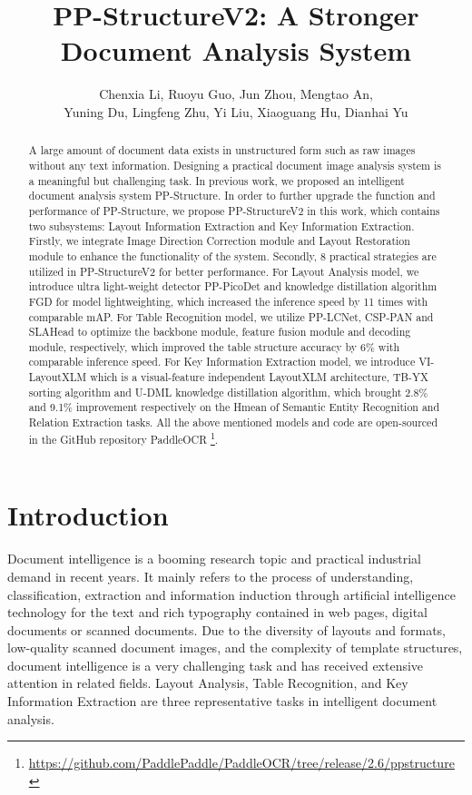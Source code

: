 \documentclass[letterpaper]{article} \usepackage{aaai21}  \usepackage{times}  \usepackage{helvet} \usepackage{courier}  \usepackage[hyphens]{url}  \usepackage{graphicx} \usepackage{algorithm}
\title{PP-StructureV2: A Stronger Document Analysis System}
\author {
    Chenxia Li, Ruoyu Guo, Jun Zhou,  Mengtao An, \\
   Yuning Du, Lingfeng Zhu, Yi Liu, Xiaoguang Hu, Dianhai Yu \\
}
\begin{document}
\maketitle

\begin{abstract}

A large amount of document data exists in unstructured form such as raw images without any text information. Designing a practical document image analysis system is a meaningful but challenging task. In previous work, we proposed an intelligent document analysis system PP-Structure. In order to further upgrade the function and performance of PP-Structure, we propose PP-StructureV2 in this work, which contains two subsystems: Layout Information Extraction and Key Information Extraction. Firstly, we integrate Image Direction Correction module and Layout Restoration module to enhance the functionality of the system. Secondly, 8 practical strategies are utilized in PP-StructureV2 for better performance. For Layout Analysis model, we introduce ultra light-weight detector PP-PicoDet and knowledge distillation algorithm FGD for model lightweighting, which increased the inference speed by 11 times with comparable mAP. For Table Recognition model, we utilize PP-LCNet, CSP-PAN and SLAHead to optimize the backbone module, feature fusion module and decoding module, respectively, which improved the table structure accuracy by 6\% with comparable inference speed. For Key Information Extraction model, we introduce VI-LayoutXLM which is a visual-feature independent LayoutXLM architecture, TB-YX sorting algorithm and U-DML knowledge distillation algorithm, which brought 2.8\% and 9.1\% improvement respectively on the Hmean of Semantic Entity Recognition and Relation Extraction tasks. All the above mentioned models and code are open-sourced in the GitHub repository PaddleOCR \footnote{\url{https://github.com/PaddlePaddle/PaddleOCR/tree/release/2.6/ppstructure}}.

\end{abstract}

\section{Introduction}

Document intelligence is a booming research topic and practical industrial demand in recent years. It mainly refers to the process of understanding, classification, extraction and information induction through artificial intelligence technology for the text and rich typography contained in web pages, digital documents or scanned documents. Due to the diversity of layouts and formats, low-quality scanned document images, and the complexity of template structures, document intelligence is a very challenging task and has received extensive attention in related fields. Layout Analysis, Table Recognition, and Key Information Extraction are three representative tasks in intelligent document analysis.
\end{document}
